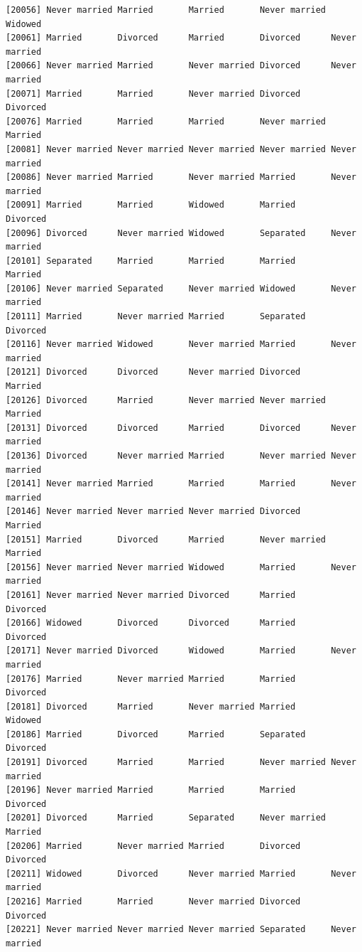 \documentclass[
  letterpaper,
  DIV=11,
  numbers=noendperiod,
  oneside]{scrartcl}
\begin{document}
\begin{verbatim}
[20056] Never married Married       Married       Never married Widowed      
[20061] Married       Divorced      Married       Divorced      Never married
[20066] Never married Married       Never married Divorced      Never married
[20071] Married       Married       Never married Divorced      Divorced     
[20076] Married       Married       Married       Never married Married      
[20081] Never married Never married Never married Never married Never married
[20086] Never married Married       Never married Married       Never married
[20091] Married       Married       Widowed       Married       Divorced     
[20096] Divorced      Never married Widowed       Separated     Never married
[20101] Separated     Married       Married       Married       Married      
[20106] Never married Separated     Never married Widowed       Never married
[20111] Married       Never married Married       Separated     Divorced     
[20116] Never married Widowed       Never married Married       Never married
[20121] Divorced      Divorced      Never married Divorced      Married      
[20126] Divorced      Married       Never married Never married Married      
[20131] Divorced      Divorced      Married       Divorced      Never married
[20136] Divorced      Never married Married       Never married Never married
[20141] Never married Married       Married       Married       Never married
[20146] Never married Never married Never married Divorced      Married      
[20151] Married       Divorced      Married       Never married Married      
[20156] Never married Never married Widowed       Married       Never married
[20161] Never married Never married Divorced      Married       Divorced     
[20166] Widowed       Divorced      Divorced      Married       Divorced     
[20171] Never married Divorced      Widowed       Married       Never married
[20176] Married       Never married Married       Married       Divorced     
[20181] Divorced      Married       Never married Married       Widowed      
[20186] Married       Divorced      Married       Separated     Divorced     
[20191] Divorced      Married       Married       Never married Never married
[20196] Never married Married       Married       Married       Divorced     
[20201] Divorced      Married       Separated     Never married Married      
[20206] Married       Never married Married       Divorced      Divorced     
[20211] Widowed       Divorced      Never married Married       Never married
[20216] Married       Married       Never married Divorced      Divorced     
[20221] Never married Never married Never married Separated     Never married

\end{verbatim}
\end{document}
